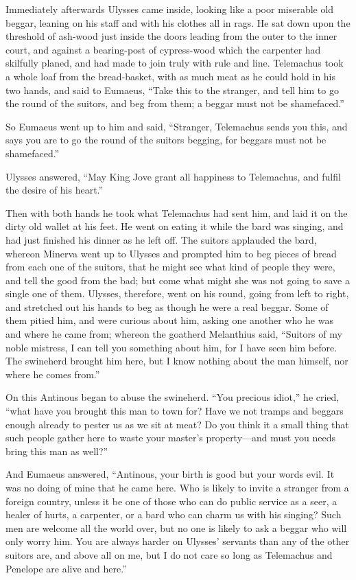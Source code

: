 Immediately afterwards Ulysses came inside, looking like a poor miserable old
beggar, leaning on his staff and with his clothes all in rags. He sat down upon
the threshold of ash-wood just inside the doors leading from the outer to the
inner court, and against a bearing-post of cypress-wood which the carpenter had
skilfully planed, and had made to join truly with rule and line. Telemachus
took a whole loaf from the bread-basket, with as much meat as he could hold in
his two hands, and said to Eumaeus, “Take this to the stranger, and tell him to
go the round of the suitors, and beg from them; a beggar must not be
shamefaced.”

So Eumaeus went up to him and said, “Stranger, Telemachus sends you this, and
says you are to go the round of the suitors begging, for beggars must not be
shamefaced.”

Ulysses answered, “May King Jove grant all happiness to Telemachus, and fulfil
the desire of his heart.”

Then with both hands he took what Telemachus had sent him, and laid it on the
dirty old wallet at his feet. He went on eating it while the bard was singing,
and had just finished his dinner as he left off. The suitors applauded the
bard, whereon Minerva went up to Ulysses and prompted him to beg pieces of
bread from each one of the suitors, that he might see what kind of people they
were, and tell the good from the bad; but come what might she was not going to
save a single one of them. Ulysses, therefore, went on his round, going from
left to right, and stretched out his hands to beg as though he were a real
beggar. Some of them pitied him, and were curious about him, asking one another
who he was and where he came from; whereon the goatherd Melanthius said,
“Suitors of my noble mistress, I can tell you something about him, for I have
seen him before. The swineherd brought him here, but I know nothing about the
man himself, nor where he comes from.”

On this Antinous began to abuse the swineherd. “You precious idiot,” he cried,
“what have you brought this man to town for? Have we not tramps and beggars
enough already to pester us as we sit at meat? Do you think it a small thing
that such people gather here to waste your master’s property—and must you needs
bring this man as well?”

And Eumaeus answered, “Antinous, your birth is good but your words evil. It was
no doing of mine that he came here. Who is likely to invite a stranger from a
foreign country, unless it be one of those who can do public service as a seer,
a healer of hurts, a carpenter, or a bard who can charm us with his singing?
Such men are welcome all the world over, but no one is likely to ask a beggar
who will only worry him. You are always harder on Ulysses’ servants than any of
the other suitors are, and above all on me, but I do not care so long as
Telemachus and Penelope are alive and here.”

